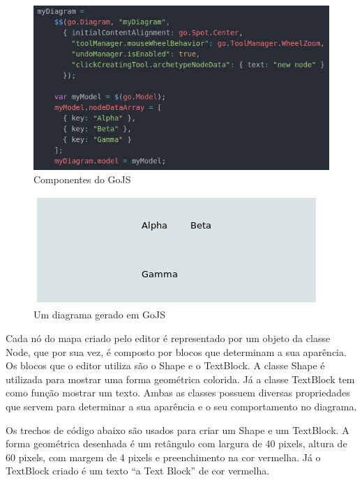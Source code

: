 \documentclass[
	12pt,				%
	openright,			%
	oneside,			%
	a4paper,			%
	english,			%
	french,				%
	spanish,			%
	brazil				%
	]{abntex2}
\begin{document}
\begin{figure}[htb]
	\caption{\label{fig_gojs} Componentes do GoJS}
	\begin{center}
		\includegraphics[scale=0.7]{gojs.png}
	\end{center}
\end{figure}

\begin{figure}[htb]
	\caption{\label{fig_diagram} Um diagrama gerado em GoJS}
	\begin{center}
		\includegraphics[scale=0.7]{diagram.png}
	\end{center}
\end{figure}

Cada nó do mapa criado pelo editor é representado por um objeto da classe Node, que por sua vez, é composto por blocos que determinam a sua aparência. Os blocos que o editor utiliza são o Shape e o TextBlock. A classe Shape é utilizada para mostrar uma forma geométrica colorida. Já a classe TextBlock tem como função mostrar um texto. Ambas as classes possuem diversas propriedades que servem para determinar a sua aparência e o seu comportamento no diagrama.

Os trechos de código abaixo são usados para criar um Shape e um TextBlock. A forma geométrica  desenhada é um retângulo com largura de 40 pixels, altura de 60 pixels, com margem de 4 pixels e preenchimento na cor vermelha. Já o TextBlock criado é um texto “a Text Block” de cor vermelha.
\end{document}
